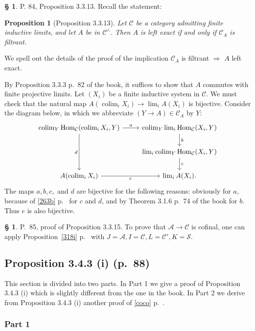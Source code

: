 \documentclass[12pt]{article}%
\newtheorem{prop}[thm]{Proposition}
\theoremstyle{remark}
\theoremstyle{definition}
\newtheorem{s}[thm]{\S}%
\newcommand{\cc}{\mathcal}
\newcommand{\A}{\mathcal A}
\newcommand{\C}{\mathcal C}
\newcommand{\then}{\Rightarrow}
\DeclareMathOperator*{\colim}{colim}
\DeclareMathOperator{\Hom}{Hom}%
\begin{document}
\begin{s}
P. 84, Proposition 3.3.13. Recall the statement:

\begin{prop}[Proposition 3.3.13]
Let $\C$ be a category admitting finite inductive limits, and let $A$ be in $\C^\wedge$. Then $A$ is left exact if and only if $\C_A$ is filtrant.
\end{prop}

We spell out the details of the proof of the implication $\C_A$ is filtrant $\then$ $A$ left exact.

By Proposition 3.3.3 p.~82 of the book, it suffices to show that $A$ commutes with finite projective limits. Let $(X_i)$ be a finite inductive system in $\C$. We must check that the natural map $A(\colim_i X_i)\to\lim_iA(X_i)$ is bijective. Consider the diagram below, in which we abbreviate $(Y\to A)\in\C_A$ by $Y$: 
$$
\begin{tikzcd}
\colim_Y\Hom_\C(\colim_iX_i,Y)\ar{r}{a}\ar{dd}[swap]{d}&\colim_Y\lim_i\Hom_\C(X_i,Y)\ar{d}{b}\\ 
{}&\lim_i\colim_Y\Hom_\C(X_i,Y)\ar{d}{c}\\ 
A(\colim_iX_i)\ar{r}[swap]{e}&\lim_iA(X_i).
\end{tikzcd}
$$ 
The maps $a,b,c,$ and $d$ are bijective for the following reasons: obviously for $a$, because of \eqref{263b} p.~\pageref{263b} for $c$ and $d$, and by Theorem 3.1.6 p.~74 of the book for $b$. Thus $e$ is also bijective.
\end{s}


\begin{s}\label{3315}
P.~85, proof of Proposition 3.3.15. To prove that $\A\to\C$ is cofinal, one can apply Proposition~\ref{318i} p.~\pageref{318i} with $J=\A,I=\C,L=\C',K=\cc S$. 
\end{s}


\subsection{Proposition 3.4.3 (i) (p.~88)}

This section is divided into two parts. In Part 1 we give a proof of Proposition 3.4.3 (i) which is slightly different from the one in the book. In Part 2 we derive from Proposition 3.4.3 (i) another proof of \eqref{coco} p.~\pageref{coco}. 

\subsubsection{Part 1} 
\end{document}
